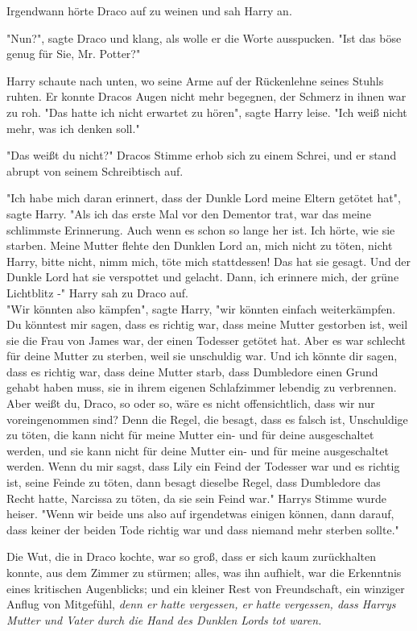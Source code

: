{Irgendwann hörte Draco auf zu weinen und sah Harry an.

"Nun?", sagte Draco und klang, als wolle er die Worte ausspucken. "Ist das böse genug für Sie, Mr. Potter?"

Harry schaute nach unten, wo seine Arme auf der Rückenlehne seines Stuhls ruhten. Er konnte Dracos Augen nicht mehr begegnen, der Schmerz in ihnen war zu roh. "Das hatte ich nicht erwartet zu hören", sagte Harry leise. "Ich weiß nicht mehr, was ich denken soll."

"Das weißt du nicht?" Dracos Stimme erhob sich zu einem Schrei, und er stand abrupt von seinem Schreibtisch auf.

"Ich habe mich daran erinnert, dass der Dunkle Lord meine Eltern getötet hat", sagte Harry. "Als ich das erste Mal vor den Dementor trat, war das meine schlimmste Erinnerung. Auch wenn es schon so lange her ist. Ich hörte, wie sie starben. Meine Mutter flehte den Dunklen Lord an, mich nicht zu töten, nicht Harry, bitte nicht, nimm mich, töte mich stattdessen! Das hat sie gesagt. Und der Dunkle Lord hat sie verspottet und gelacht. Dann, ich erinnere mich, der grüne Lichtblitz -" Harry sah zu Draco auf.\\ "Wir könnten also kämpfen", sagte Harry, "wir könnten einfach weiterkämpfen. Du könntest mir sagen, dass es richtig war, dass meine Mutter gestorben ist, weil sie die Frau von James war, der einen Todesser getötet hat. Aber es war schlecht für deine Mutter zu sterben, weil sie unschuldig war. Und ich könnte dir sagen, dass es richtig war, dass deine Mutter starb, dass Dumbledore einen Grund gehabt haben muss, sie in ihrem eigenen Schlafzimmer lebendig zu verbrennen. Aber weißt du, Draco, so oder so, wäre es nicht offensichtlich, dass wir nur voreingenommen sind? Denn die Regel, die besagt, dass es falsch ist, Unschuldige zu töten, die kann nicht für meine Mutter ein- und für deine ausgeschaltet werden, und sie kann nicht für deine Mutter ein- und für meine ausgeschaltet werden. Wenn du mir sagst, dass Lily ein Feind der Todesser war und es richtig ist, seine Feinde zu töten, dann besagt dieselbe Regel, dass Dumbledore das Recht hatte, Narcissa zu töten, da sie sein Feind war." Harrys Stimme wurde heiser. "Wenn wir beide uns also auf irgendetwas einigen können, dann darauf, dass keiner der beiden Tode richtig war und dass niemand mehr sterben sollte."

Die Wut, die in Draco kochte, war so groß, dass er sich kaum zurückhalten konnte, aus dem Zimmer zu stürmen; alles, was ihn aufhielt, war die Erkenntnis eines kritischen Augenblicks; und ein kleiner Rest von Freundschaft, ein winziger Anflug von Mitgefühl, \emph{denn er hatte vergessen, er hatte vergessen, dass Harrys Mutter und Vater durch die Hand des Dunklen Lords tot waren.}

}
